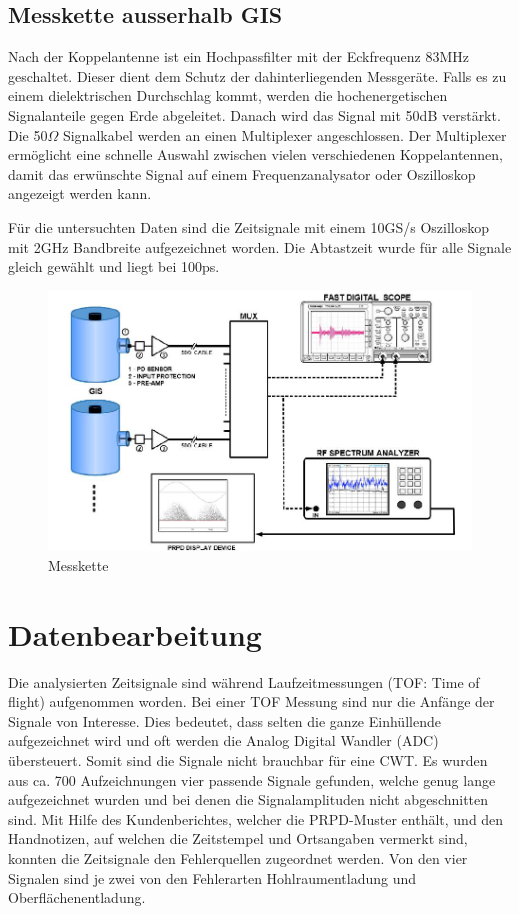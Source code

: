 \begin{refsection}
\subsection{Messkette ausserhalb GIS}
Nach der Koppelantenne ist ein Hochpassfilter mit der Eckfrequenz 83MHz geschaltet.
%
Dieser dient dem Schutz der dahinterliegenden Messgeräte.
Falls es zu einem dielektrischen Durchschlag kommt, werden die hochenergetischen Signalanteile gegen Erde abgeleitet.
%
Danach wird das Signal mit 50dB verstärkt.
Die 50$\Omega$ Signalkabel werden an einen Multiplexer angeschlossen. 
%
Der Multiplexer ermöglicht eine schnelle Auswahl zwischen vielen verschiedenen Koppelantennen, damit das erwünschte Signal auf einem Frequenzanalysator oder Oszilloskop angezeigt werden kann. 

Für die untersuchten Daten sind die Zeitsignale mit einem 10GS/s Oszilloskop mit 2GHz Bandbreite aufgezeichnet worden.
Die Abtastzeit wurde für alle Signale gleich gewählt und liegt bei 100ps. 
\begin{figure}
	\centering
	\includegraphics[width=0.9\linewidth]{papers/gis/Bilder/MessketteAusGIS}
	\caption{Messkette \cite{report:ABBOnSite}}
	\label{fig:messketteausgis}
\end{figure}

 
\section{Datenbearbeitung}

Die analysierten Zeitsignale sind während Laufzeitmessungen (TOF: Time of flight) aufgenommen worden. 
%
Bei einer TOF Messung sind nur die Anfänge der Signale von Interesse.
Dies bedeutet, dass selten die ganze Einhüllende aufgezeichnet wird und oft werden die Analog Digital Wandler (ADC) übersteuert. 
%
%
Somit sind die Signale nicht brauchbar für eine CWT.
Es wurden aus ca. 700 Aufzeichnungen vier passende Signale gefunden, welche genug lange aufgezeichnet wurden und bei denen die Signalamplituden nicht abgeschnitten sind. 
Mit Hilfe des Kundenberichtes, welcher die PRPD-Muster enthält, und den Handnotizen, auf welchen die Zeitstempel und Ortsangaben vermerkt sind, konnten die Zeitsignale den Fehlerquellen zugeordnet werden.
Von den vier Signalen sind je zwei von den Fehlerarten Hohlraumentladung und Oberflächenentladung.
\begin{figure}
	\centering
	

\end{figure}
\end{refsection}
